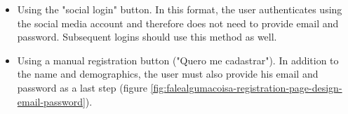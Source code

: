 \begin{itemize}
    \item Using the "social login" button. In this format, the user authenticates using the social media account and therefore does not need to provide email and password. Subsequent logins should use this method as well.
    \item Using a manual registration button ("Quero me cadastrar"). In addition to the name and demographics, the user must also provide his email and password as a last step (figure \ref{fig:falealgumacoisa-registration-page-design-email-password}).
\end{itemize}

\begin{figure}[h]
    \centering
    \caption{Fale Alguma Coisa Registration steps designs}
    \begin{subfigure}{.5\textwidth}
      \centering

\end{subfigure}
\end{figure}
